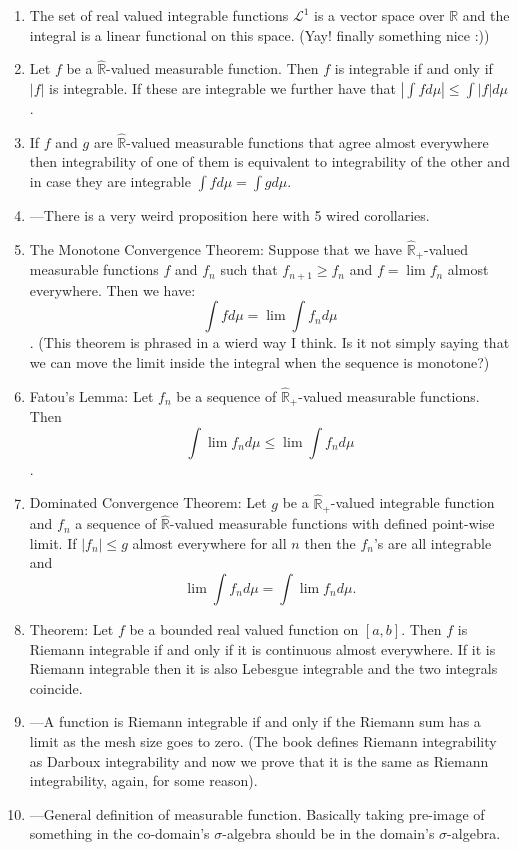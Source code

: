 \documentclass{article}
\begin{document}
\begin{enumerate}
    \item The set of real valued integrable functions $\mathscr{L}^1$ is a vector space over $\mathbb{R}$ and the integral is a linear functional on this space. (Yay! finally something nice :)) 
    \item Let $f$ be a $\hat{\mathbb{R}}$-valued measurable function. Then $f$ is integrable if and only if $|f|$ is integrable. If these are integrable we further have that $|\int fd\mu| \leq \int |f|d\mu$.
    \item If $f$ and $g$ are $\hat{\mathbb{R}}$-valued measurable functions that agree almost everywhere then integrability of one of them is equivalent to integrability of the other and in case they are integrable $\int fd\mu = \int gd\mu$.
    \item ---There is a very weird proposition here with 5 wired corollaries.
    \item The Monotone Convergence Theorem: Suppose that we have $\hat{\mathbb{R}}_+$-valued measurable functions $f$ and $f_n$ such that $f_{n+1}\geq f_n$ and $f = \lim f_n$ almost everywhere. Then we have: \[\int fd\mu = \lim \int f_n d\mu\]. (This theorem is phrased in a wierd way I think. Is it not simply saying that we can move the limit inside the integral when the sequence is monotone?)
    \item Fatou's Lemma: Let $f_n$ be a sequence of $\hat{\mathbb{R}}_+$-valued measurable functions. Then \[\int \lim f_nd\mu \leq \lim \int f_nd\mu\].
    \item Dominated Convergence Theorem: Let $g$ be a $\hat{\mathbb{R}}_+$-valued integrable function and $f_n$ a sequence of $\hat{\mathbb{R}}$-valued measurable functions with defined point-wise limit. If $|f_n|\leq g$ almost everywhere for all $n$ then the $f_n$'s are all integrable and \[\lim \int f_n d\mu = \int \lim f_n d\mu.\]
    \item Theorem: Let $f$ be a bounded real valued function on $[a,b]$. Then $f$ is Riemann integrable if and only if it is continuous almost everywhere. If it is Riemann integrable then it is also Lebesgue integrable and the two integrals coincide.
    \item ---A function is Riemann integrable if and only if the Riemann sum has a limit as the mesh size goes to zero. (The book defines Riemann integrability as Darboux integrability and now we prove that it is the same as Riemann integrability, again, for some reason).
    \item ---General definition of measurable function. Basically taking pre-image of something in the co-domain's $\sigma$-algebra should be in the domain's $\sigma$-algebra.

\end{enumerate}
\end{document}
